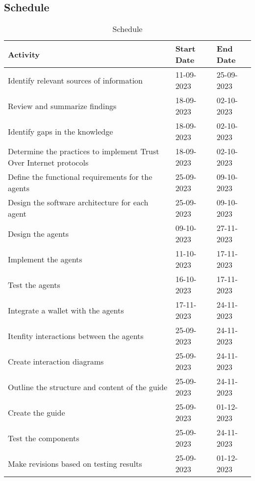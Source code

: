 \subsection{Schedule}

\begin{table}[h]
    \centering
        \begin{tabularx}{\textwidth}{|m{7.5cm}|X|X|}
            \hline
            Activity & Start Date & End Date \\
            \hline
            Identify relevant sources of information & 11-09-2023 & 25-09-2023 \\
            \hline
            Review and summarize findings & 18-09-2023 & 02-10-2023 \\
            \hline
            Identify gaps in the knowledge & 18-09-2023 & 02-10-2023 \\
            \hline
            Determine the practices to implement Trust Over Internet protocols & 18-09-2023 & 02-10-2023 \\
            \hline
            Define the functional requirements for the agents & 25-09-2023 & 09-10-2023 \\
            \hline
            Design the software architecture for each agent & 25-09-2023 & 09-10-2023 \\
            \hline
            Design the agents & 09-10-2023 & 27-11-2023 \\
            \hline
            Implement the agents & 11-10-2023 & 17-11-2023 \\
            \hline
            Test the agents & 16-10-2023 & 17-11-2023 \\
            \hline
            Integrate a wallet with the agents & 17-11-2023 & 24-11-2023 \\
            \hline
            Itenfity interactions between the agents & 25-09-2023 & 24-11-2023 \\
            \hline
            Create interaction diagrams & 25-09-2023 & 24-11-2023 \\
            \hline
            Outline the structure and content of the guide & 25-09-2023 & 24-11-2023 \\
            \hline
            Create the guide & 25-09-2023 & 01-12-2023 \\
            \hline
            Test the components & 25-09-2023 & 24-11-2023 \\
            \hline
            Make revisions based on testing results & 25-09-2023 & 01-12-2023 \\
            \hline
        \end{tabularx}
    \caption{Schedule}
  \end{table}

